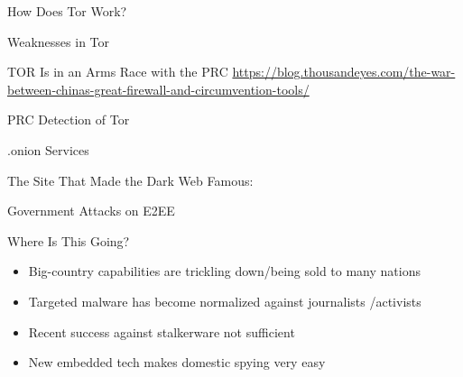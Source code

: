 \documentclass[nobackground,dvipsnames,table]{beamer}
\begin{document}
\begin{frame}{How Does Tor Work?}
    
\end{frame}

\begin{frame}{Weaknesses in Tor}
    
\end{frame}

\begin{frame}{TOR Is in an Arms Race with the PRC}
    \url{https://blog.thousandeyes.com/the-war-between-chinas-great-firewall-and-circumvention-tools/}
\end{frame}

\begin{frame}{PRC Detection of Tor}
    
\end{frame}

\begin{frame}{.onion Services}
    
\end{frame}

\begin{frame}{The Site That Made the Dark Web Famous:}
    
\end{frame}

\begin{frame}{Government Attacks on E2EE}
    
\end{frame}

\begin{frame}{Where Is This Going?}
    \begin{itemize}
        \item Big-country capabilities are trickling down/being sold to many nations
        \item Targeted malware has become normalized  against journalists /activists
        \item Recent success against stalkerware not sufficient 
        \item New embedded tech makes domestic spying very easy
    \end{itemize}
\end{frame}

\backpage
\end{document}
